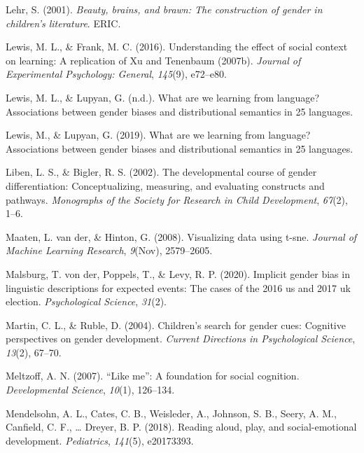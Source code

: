 \documentclass[english,,man,floatsintext]{apa6}
\begin{document}
\leavevmode\hypertarget{ref-lehr2001beauty}{}%
Lehr, S. (2001). \emph{Beauty, brains, and brawn: The construction of gender in children's literature}. ERIC.

\leavevmode\hypertarget{ref-lewis2016understanding}{}%
Lewis, M. L., \& Frank, M. C. (2016). Understanding the effect of social context on learning: A replication of Xu and Tenenbaum (2007b). \emph{Journal of Experimental Psychology: General}, \emph{145}(9), e72--e80.

\leavevmode\hypertarget{ref-lewis2019gender}{}%
Lewis, M. L., \& Lupyan, G. (n.d.). What are we learning from language? Associations between gender biases and distributional semantics in 25 languages.

\leavevmode\hypertarget{ref-lewis2019we}{}%
Lewis, M., \& Lupyan, G. (2019). What are we learning from language? Associations between gender biases and distributional semantics in 25 languages.

\leavevmode\hypertarget{ref-liben2002introduction}{}%
Liben, L. S., \& Bigler, R. S. (2002). The developmental course of gender differentiation: Conceptualizing, measuring, and evaluating constructs and pathways. \emph{Monographs of the Society for Research in Child Development}, \emph{67}(2), 1--6.

\leavevmode\hypertarget{ref-maaten2008visualizing}{}%
Maaten, L. van der, \& Hinton, G. (2008). Visualizing data using t-sne. \emph{Journal of Machine Learning Research}, \emph{9}(Nov), 2579--2605.

\leavevmode\hypertarget{ref-von2018implicit}{}%
Malsburg, T. von der, Poppels, T., \& Levy, R. P. (2020). Implicit gender bias in linguistic descriptions for expected events: The cases of the 2016 us and 2017 uk election. \emph{Psychological Science}, \emph{31}(2).

\leavevmode\hypertarget{ref-martin2004children}{}%
Martin, C. L., \& Ruble, D. (2004). Children's search for gender cues: Cognitive perspectives on gender development. \emph{Current Directions in Psychological Science}, \emph{13}(2), 67--70.

\leavevmode\hypertarget{ref-meltzoff2007like}{}%
Meltzoff, A. N. (2007). ``Like me'': A foundation for social cognition. \emph{Developmental Science}, \emph{10}(1), 126--134.

\leavevmode\hypertarget{ref-mendelsohn2018reading}{}%
Mendelsohn, A. L., Cates, C. B., Weisleder, A., Johnson, S. B., Seery, A. M., Canfield, C. F., \ldots{} Dreyer, B. P. (2018). Reading aloud, play, and social-emotional development. \emph{Pediatrics}, \emph{141}(5), e20173393.
\end{document}
